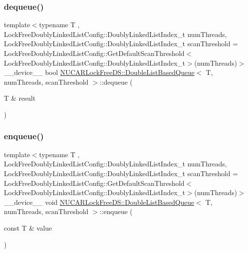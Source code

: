 \subsubsection{\texorpdfstring{dequeue()}{dequeue()}}
{\footnotesize\ttfamily template$<$typename T , Lock\+Free\+Doubly\+Linked\+List\+Config\+::\+Doubly\+Linked\+List\+Index\+\_\+t num\+Threads, Lock\+Free\+Doubly\+Linked\+List\+Config\+::\+Doubly\+Linked\+List\+Index\+\_\+t scan\+Threshold = Lock\+Free\+Doubly\+Linked\+List\+Config\+::\+Get\+Default\+Scan\+Threshold$<$\+Lock\+Free\+Doubly\+Linked\+List\+Config\+::\+Doubly\+Linked\+List\+Index\+\_\+t$>$(num\+Threads)$>$ \\
\+\_\+\+\_\+device\+\_\+\+\_\+ bool \mbox{\hyperlink{class_n_u_c_a_r_lock_free_d_s_1_1_double_list_based_queue}{N\+U\+C\+A\+R\+Lock\+Free\+D\+S\+::\+Double\+List\+Based\+Queue}}$<$ T, num\+Threads, scan\+Threshold $>$\+::dequeue (\begin{DoxyParamCaption}\item[{T \&}]{result }\end{DoxyParamCaption})\hspace{0.3cm}{\ttfamily [inline]}}

\mbox{\label{class_n_u_c_a_r_lock_free_d_s_1_1_double_list_based_queue_ad9f196b3ea9ee4c684a5fab3c6bb9ddd}} 
\subsubsection{\texorpdfstring{enqueue()}{enqueue()}}
{\footnotesize\ttfamily template$<$typename T , Lock\+Free\+Doubly\+Linked\+List\+Config\+::\+Doubly\+Linked\+List\+Index\+\_\+t num\+Threads, Lock\+Free\+Doubly\+Linked\+List\+Config\+::\+Doubly\+Linked\+List\+Index\+\_\+t scan\+Threshold = Lock\+Free\+Doubly\+Linked\+List\+Config\+::\+Get\+Default\+Scan\+Threshold$<$\+Lock\+Free\+Doubly\+Linked\+List\+Config\+::\+Doubly\+Linked\+List\+Index\+\_\+t$>$(num\+Threads)$>$ \\
\+\_\+\+\_\+device\+\_\+\+\_\+ void \mbox{\hyperlink{class_n_u_c_a_r_lock_free_d_s_1_1_double_list_based_queue}{N\+U\+C\+A\+R\+Lock\+Free\+D\+S\+::\+Double\+List\+Based\+Queue}}$<$ T, num\+Threads, scan\+Threshold $>$\+::enqueue (\begin{DoxyParamCaption}\item[{const T \&}]{value }\end{DoxyParamCaption})\hspace{0.3cm}{\ttfamily [inline]}}



